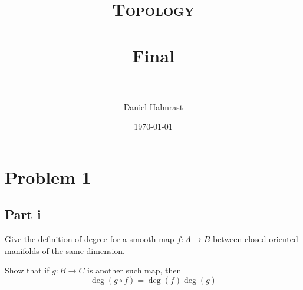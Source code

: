 \documentclass[fontsize=11pt]{scrartcl} %
\title{	
\normalfont \normalsize 
\textsc{Topology} \\ [25pt] %
\horrule{0.5pt} \\[0.4cm] %
\huge Final \\ %
\horrule{2pt} \\[0.5cm] %
}
\author{Daniel Halmrast} %
\date{\normalsize\today} %
\numberwithin{equation}{section} %
\numberwithin{figure}{section} %
\numberwithin{table}{section} %
\begin{document}
\maketitle %

\section*{Problem 1}
\subsection*{Part i}
Give the definition of degree for a smooth map $f:A\to B$ between closed
oriented manifolds of the same dimension.

Show that if $g:B\to C$ is another such map, then
\[
    \deg(g\circ f) = \deg(f)\deg(g)
\]
\end{document}
